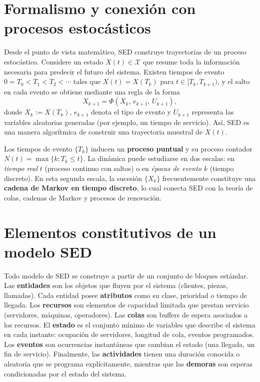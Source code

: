 \documentclass[11pt, letterpaper]{article}
\begin{document}
\section{Formalismo y conexión con procesos estocásticos}

Desde el punto de vista matemático, SED construye trayectorias de un proceso estocástico. Considere un estado $X(t) \in \mathcal{X}$ que resume toda la información necesaria para predecir el futuro del sistema. Existen tiempos de evento $0 = T_0 < T_1 < T_2 < \cdots$ tales que $X(t) = X(T_k)$ para $t \in [T_k, T_{k+1})$, y el salto en cada evento se obtiene mediante una regla de la forma
\[
X_{k+1} = \Phi(X_k,\, e_{k+1},\, U_{k+1}),
\]
donde $X_k := X(T_k)$, $e_{k+1}$ denota el tipo de evento y $U_{k+1}$ representa las variables aleatorias generadas (por ejemplo, un tiempo de servicio). Así, SED es una manera algorítmica de construir una trayectoria muestral de $X(t)$.

Los tiempos de evento $\{T_k\}$ inducen un \textbf{proceso puntual} y su proceso contador $N(t) = \max\{k : T_k \leq t\}$. La dinámica puede estudiarse en dos escalas: en \emph{tiempo real} $t$ (proceso continuo con saltos) o en \emph{épocas de evento} $k$ (tiempo discreto). En esta segunda escala, la sucesión $\{X_k\}$ frecuentemente constituye una \textbf{cadena de Markov en tiempo discreto}, lo cual conecta SED con la teoría de colas, cadenas de Markov y procesos de renovación.


\section{Elementos constitutivos de un modelo SED}

Todo modelo de SED se construye a partir de un conjunto de bloques estándar. Las \textbf{entidades} son los objetos que fluyen por el sistema (clientes, piezas, llamadas). Cada entidad posee \textbf{atributos} como su clase, prioridad o tiempo de llegada. Los \textbf{recursos} son elementos de capacidad limitada que prestan servicio (servidores, máquinas, operadores). Las \textbf{colas} son buffers de espera asociados a los recursos. El \textbf{estado} es el conjunto mínimo de variables que describe el sistema en cada instante: ocupación de servidores, longitud de cola, eventos programados. Los \textbf{eventos} son ocurrencias instantáneas que cambian el estado (una llegada, un fin de servicio). Finalmente, las \textbf{actividades} tienen una duración conocida o aleatoria que se programa explícitamente, mientras que las \textbf{demoras} son esperas condicionadas por el estado del sistema.
\end{document}
